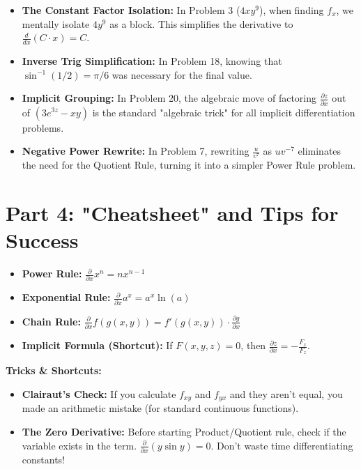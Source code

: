 \documentclass{article}
\begin{document}
\begin{itemize}
    \item \textbf{The Constant Factor Isolation:} In Problem 3 ($4xy^9$), when finding $f_x$, we mentally isolate $4y^9$ as a block. This simplifies the derivative to $\frac{d}{dx} (C \cdot x) = C$.
    \item \textbf{Inverse Trig Simplification:} In Problem 18, knowing that $\sin^{-1}(1/2) = \pi/6$ was necessary for the final value.
    \item \textbf{Implicit Grouping:} In Problem 20, the algebraic move of factoring $\frac{\partial z}{\partial x}$ out of $(3e^{3z} - xy)$ is the standard "algebraic trick" for all implicit differentiation problems.
    \item \textbf{Negative Power Rewrite:} In Problem 7, rewriting $\frac{u}{v^7}$ as $u v^{-7}$ eliminates the need for the Quotient Rule, turning it into a simpler Power Rule problem.
\end{itemize}

\section{Part 4: "Cheatsheet" and Tips for Success}

\begin{tcolorbox}[title=Summary of Formulas]
\begin{itemize}
    \item \textbf{Power Rule:} $\frac{\partial}{\partial x} x^n = n x^{n-1}$
    \item \textbf{Exponential Rule:} $\frac{\partial}{\partial x} a^x = a^x \ln(a)$
    \item \textbf{Chain Rule:} $\frac{\partial}{\partial x} f(g(x,y)) = f'(g(x,y)) \cdot \frac{\partial g}{\partial x}$
    \item \textbf{Implicit Formula (Shortcut):} If $F(x,y,z) = 0$, then $\frac{\partial z}{\partial x} = -\frac{F_x}{F_z}$.
\end{itemize}
\end{tcolorbox}

\textbf{Tricks \& Shortcuts:}
\begin{itemize}
    \item \textbf{Clairaut's Check:} If you calculate $f_{xy}$ and $f_{yx}$ and they aren't equal, you made an arithmetic mistake (for standard continuous functions).
    \item \textbf{The Zero Derivative:} Before starting Product/Quotient rule, check if the variable exists in the term. $\frac{\partial}{\partial x}(y \sin y) = 0$. Don't waste time differentiating constants!
\end{itemize}
\end{document}
